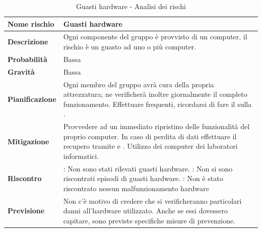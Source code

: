 \documentclass[12pt,a4paper]{article}
\begin{document}
\begin{table}[H]
	\begin{center}
		\begin{tabular}{p{} p{}}
			\toprule
			\textbf{Nome rischio} & \textbf{Guasti hardware} \\
			\midrule
			\midrule
			\textbf{Descrizione} &  Ogni componente del gruppo è provvisto di un computer, il rischio è un guasto ad uno o più computer. \\
			\midrule
			\textbf{Probabilità} & Bassa \\
			\midrule
			\textbf{Gravità} & Bassa \\
			\midrule
			\textbf{Pianificazione} & Ogni membro del gruppo avrà cura della propria attrezzatura; ne verificherà inoltre giornalmente il completo funzionamento. Effettuare \mgls{backup} frequenti, ricordarsi di fare il \mgls{push} sulla \mgls{repository}. \\
			\midrule
			\textbf{Mitigazione} & Provvedere ad un immediato ripristino delle funzionalità del proprio computer. In caso di perdita di dati effettuare il recupero tramite \mgls{backup} e \mgls{repository}. Utilizzo dei computer dei laboratori informatici. \\
			\midrule
			\textbf{Riscontro} & 
                \textbf{\FA{}}: Non sono stati rilevati guasti hardware. \newline
                \textbf{\FAD{}}: Non si sono riscontrati episodi di guasti hardware. \newline
                \textbf{\FPA{}}: Non è stato riscontrato nessun malfunzionamento hardware \\
            \midrule
			\textbf{Previsione} & Non c'è motivo di credere che si verificheranno particolari danni all'hardware utilizzato. Anche se essi dovessero capitare, sono previste specifiche misure di prevenzione. \\
			\bottomrule
		\end{tabular}
		\caption{Guasti hardware - Analisi dei rischi}
	\end{center}
\end{table}
\end{document}

